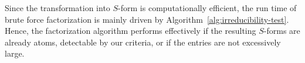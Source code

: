 \newpage
Since the transformation into $S$-form is computationally efficient, the run time of brute force factorization is mainly driven by Algorithm~\ref{alg:irreducibility-test}. Hence, the factorization algorithm performs effectively if the resulting $S$-forms are already atoms, detectable by our criteria, or if the entries are not excessively large. 